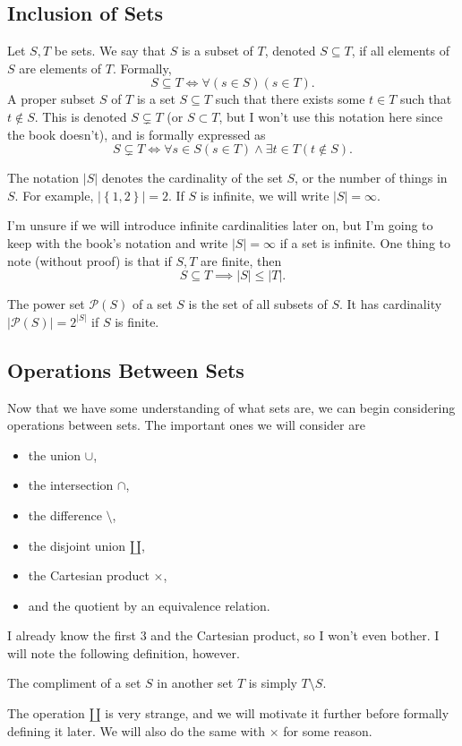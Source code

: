 \subsection{Inclusion of Sets}
\begin{definition}[Subset]\label{dfn:1.4}
	Let $S,T$ be sets. We say that $S$ is a subset of $T$, denoted $S\subseteq T$,  if all elements of $S$ are elements of $T$. Formally,
	\[
		S\subseteq T \iff\forall \left( s\in S \right) \left( s\in T \right) 
	.\]
	A proper subset $S$ of $T$ is a set $S\subseteq T$ such that there exists some $t\in T$ such that $t\notin S$. This is denoted $S\subsetneq T$ (or $S\subset T$, but I won't use this notation here since the book doesn't), and is formally expressed as
	\[
		S\subsetneq T \iff \forall s\in S(s\in T)\land \exists t\in T\left( t\notin S \right) 
	.\]
\end{definition}
\begin{definition}[Cardinality]\label{dfn:1.5}
	The notation $\left| S \right| $ denotes the cardinality of the set $S$, or the number of things in $S$. For example, $\left| \left\{ 1,2 \right\}  \right| =2$. If $S$ is infinite, we will write $\left| S \right| =\infty$.
\end{definition}

I'm unsure if we will introduce infinite cardinalities later on, but I'm going to keep with the book's notation and write $\left| S \right| =\infty$ if a set is infinite. One thing to note (without proof) is that if $S,T$ are finite, then
\[
	S\subseteq T \implies \left| S \right| \leq \left| T \right|
.\]
\begin{definition}\label{dfn:1.6}
	The power set $\mathscr{P} (S)$ of a set $S$ is the set of all subsets of $S$. It has cardinality $\left| \mathscr{P} (S) \right| =2^{\left| S \right| }$ if $S$ is finite.
\end{definition}
\subsection{Operations Between Sets}
Now that we have some understanding of what sets are, we can begin considering operations between sets. The important ones we will consider are
\begin{itemize}
	\item the union $\cup $,
	\item the intersection $\cap $,
	\item the difference $\setminus$,
	\item the disjoint union $\amalg $,
	\item the Cartesian product $\times $,
	\item and the quotient by an equivalence relation.
\end{itemize}
I already know the first 3 and the Cartesian product, so I won't even bother. I will note the following definition, however.
\begin{definition}[Compliment]\label{dfn:1.7}
	The compliment of a set $S$ in another set $T$ is simply $T\setminus S$.
\end{definition}
The operation $\amalg $ is very strange, and we will motivate it further before formally defining it later. We will also do the same with $\times $ for some reason.
